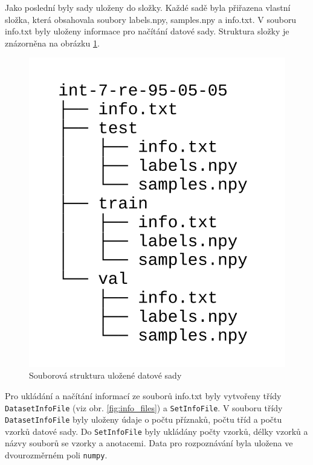 \documentclass[FM,BP]{tulthesis}
\begin{document}
Jako poslední byly sady uloženy do složky. Každé sadě byla přiřazena vlastní složka, která obsahovala soubory labels.npy, samples.npy a info.txt. V souboru info.txt byly uloženy informace pro načítání datové sady. Struktura složky je znázorněna na obrázku \mbox{\ref{fig:file_structure}}. 

\begin{figure}[ht]
\centerline{\includegraphics[scale=.22]{dataset_file_structure.png}}
\caption{Souborová struktura uložené datové sady}
\label{fig:file_structure}
\end{figure}
\FloatBarrier

Pro ukládání a načítání informací ze souborů info.txt byly vytvořeny třídy \texttt{\mbox{DatasetInfoFile}} (viz obr. \mbox{\ref{fig:info_files}}) a \texttt{\mbox{SetInfoFile}}. V souboru třídy \texttt{\mbox{DatasetInfoFile}} byly uloženy údaje o počtu příznaků, počtu tříd a počtu vzorků datové sady. Do \texttt{\mbox{SetInfoFile}} byly ukládány počty vzorků, délky vzorků a názvy souborů se vzorky a anotacemi. Data pro rozpoznávání byla uložena ve dvourozměrném poli \texttt{\mbox{numpy}}.
\end{document}
